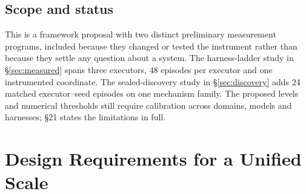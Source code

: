 \documentclass[11pt]{article}
\theoremstyle{definition}
\begin{document}
\subsection{Scope and status}

This is a framework proposal with two distinct preliminary measurement programs, included because they changed or tested the instrument rather than because they settle any question about a system. The harness-ladder study in \S\ref{sec:measured} spans three executors, 48 episodes per executor and one instrumented coordinate. The sealed-discovery study in \S\ref{sec:discovery} adds 24 matched executor--seed episodes on one mechanism family. The proposed levels and numerical thresholds still require calibration across domains, models and harnesses; \S21 states the limitations in full.

\section{Design Requirements for a Unified Scale}
\end{document}
